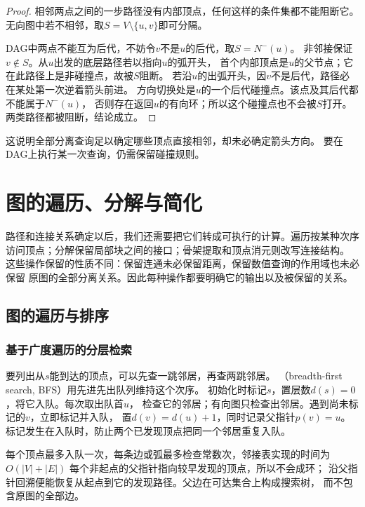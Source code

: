 \begin{proof}
相邻两点之间的一步路径没有内部顶点，任何这样的条件集都不能阻断它。
无向图中若不相邻，取\(S=V\setminus\{u,v\}\)即可分隔。

DAG中两点不能互为后代，不妨令\(v\)不是\(u\)的后代，取\(S=N^-(u)\)。
非邻接保证\(v\notin S\)。从\(u\)出发的底层路径若以指向\(u\)的弧开头，
首个内部顶点是\(u\)的父节点；它在此路径上是非碰撞点，故被\(S\)阻断。
若沿\(u\)的出弧开头，因\(v\)不是后代，路径必在某处第一次逆着箭头前进。
方向切换处是\(u\)的一个后代碰撞点。该点及其后代都不能属于\(N^-(u)\)，
否则存在返回\(u\)的有向环；所以这个碰撞点也不会被\(S\)打开。
两类路径都被阻断，结论成立。
\end{proof}

这说明全部分离查询足以确定哪些顶点直接相邻，却未必确定箭头方向。
要在DAG上执行某一次查询，仍需保留碰撞规则。

\section{图的遍历、分解与简化}
\label{sec:graph-theory-traversal-separation-decomposition}

路径和连接关系确定以后，我们还需要把它们转成可执行的计算。遍历按某种次序
访问顶点；分解保留局部块之间的接口；骨架提取和顶点消元则改写连接结构。
这些操作保留的性质不同：保留连通未必保留距离，保留数值查询的作用域也未必保留
原图的全部分离关系。因此每种操作都要明确它的输出以及被保留的关系。

\subsection{图的遍历与排序}

\subsubsection{基于广度遍历的分层检索}
\label{sec:graph-theory-bfs}

要列出从\(s\)能到达的顶点，可以先查一跳邻居，再查两跳邻居。
（breadth-first search, BFS）用先进先出队列维持这个次序。
初始化时标记\(s\)，置层数\(d(s)=0\)，将它入队。每次取出队首\(u\)，
检查它的邻居；有向图只检查出邻居。遇到尚未标记的\(v\)，立即标记并入队，
置\(d(v)=d(u)+1\)，同时记录父指针\(p(v)=u\)。
标记发生在入队时，防止两个已发现顶点把同一个邻居重复入队。

每个顶点最多入队一次，每条边或弧最多检查常数次，邻接表实现的时间为
\(O(|V|+|E|)\)
每个非起点的父指针指向较早发现的顶点，所以不会成环；
沿父指针回溯便能恢复从起点到它的发现路径。父边在可达集合上构成搜索树，
而不包含原图的全部边。

